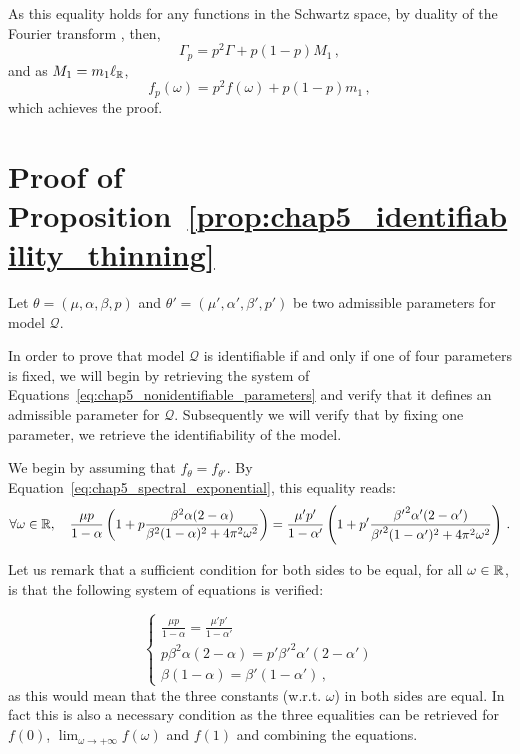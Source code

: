 \begin{subappendices}
        As this equality holds for any functions in the Schwartz space, by duality of the Fourier transform \parencite{Pinsky2008}, then,
        \[\Gamma_p = p^2 \Gamma + p(1-p) M_1\,,\]
        and as $M_1 = m_1 \ell_{{\mathbb R}}$,
        \[f_p(\omega) = p^2 f(\omega) + p(1-p) m_1\,,\]
        which achieves the proof.



    \section{Proof of Proposition~\ref{prop:chap5_identifiability_thinning}}\label{appendix:chap5_proof_identifiability_thinning}

    Let $\theta = (\mu, \alpha, \beta, p)$ and $\theta' = (\mu', \alpha', \beta', p')$ be two admissible parameters for model $\mathcal{Q}$.

    In order to prove that model $\mathcal{Q}$ is identifiable if and only if one of four parameters is fixed, 
    we will begin by retrieving the system of Equations~\eqref{eq:chap5_nonidentifiable_parameters}
    and verify that it defines an admissible parameter for $\mathcal{Q}$.
    Subsequently we will verify that by fixing one parameter, we retrieve the identifiability of the model.
    
    We begin by assuming that $f_\theta = f_{\theta'}$.
    By Equation~\eqref{eq:chap5_spectral_exponential}, this equality reads:
    \[\forall \omega \in {\mathbb R},\quad 
    \frac{\mu p }{1-\alpha}\left(1 + p \frac{\beta^2 \alpha (2-\alpha)}{\beta^2(1-\alpha)^2 + 4 \pi^2 \omega^2}\right) = 
    \frac{\mu' p' }{1-\alpha'}\left(1 + p' \frac{{\beta'}^2 \alpha' (2-\alpha')}{{\beta'}^2(1-\alpha')^2 + 4 \pi^2 \omega^2}\right)\,.
    \]

    Let us remark that a sufficient condition for both sides to be equal, 
    for all $\omega \in {\mathbb R}$,
    is that the following system of equations is verified:

    \begin{equation}\label{eq:chap5_system_identifiability}
        \begin{cases}
            \frac{\mu p }{1-\alpha} = \frac{\mu' p'}{1-\alpha'}\\
            p \beta^2 \alpha(2-\alpha) = p' {\beta'}^2 \alpha'(2-\alpha')\\
            \beta (1-\alpha) = \beta' (1-\alpha')\,,
        \end{cases}
    \end{equation}
    as this would mean that the three constants (w.r.t. $\omega$) in both sides are equal.
    In fact this is also a necessary condition as the three equalities can be retrieved for $f(0)$, $\lim_{\omega\to+\infty}{f(\omega)}$ and $f(1)$
    and combining the equations.


\end{subappendices}
